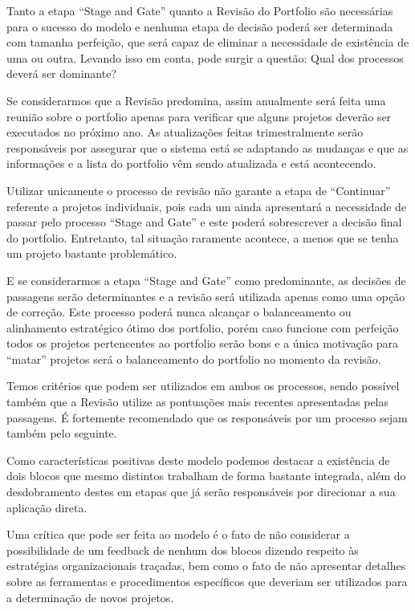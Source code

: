 \documentclass[12pt,a4paper,ruledheader,tocpage=prefix,floatnumber=continuous,pagestart=folhaderosto,font=times]{abnt}
\begin{document}
Tanto a etapa ``Stage and Gate'' quanto a Revisão do Portfolio são necessárias para o sucesso do modelo e nenhuma etapa de decisão poderá ser determinada
com tamanha perfeição, que será capaz de eliminar a necessidade de existência de uma ou outra. Levando isso em conta, pode surgir a questão: Qual dos 
processos deverá ser dominante?

Se considerarmos que a Revisão predomina, assim anualmente será feita uma reunião sobre o portfolio apenas para verificar que alguns projetos deverão
ser executados no próximo ano. As atualizações feitas trimestralmente serão responsáveis por assegurar que o sistema está se adaptando as mudanças
e que as informações e a lista do portfolio vêm sendo atualizada e está acontecendo. 

Utilizar unicamente o processo de revisão não garante a etapa de ``Continuar'' referente a projetos individuais, pois cada um ainda apresentará a 
necessidade de passar pelo processo ``Stage and Gate'' e este poderá sobrescrever a decisão final do portfolio. Entretanto, tal situação raramente 
acontece, a menos que se tenha um projeto bastante problemático.

E se considerarmos a etapa ``Stage and Gate'' como predominante, as decisões de passagens serão determinantes e a revisão será utilizada apenas como
uma opção de correção. Este processo poderá nunca alcançar o balanceamento ou alinhamento estratégico ótimo dos portfolio, porém caso funcione com perfeição
todos os projetos pertencentes ao portfolio serão bons e a única motivação para ``matar'' projetos será o balanceamento do portfolio no momento da 
revisão.

Temos critérios que podem ser utilizados em ambos os processos, sendo possível também que a Revisão utilize as pontuações mais recentes apresentadas pelas 
passagens. É fortemente recomendado que os responsáveis por um processo sejam também pelo seguinte.

Como características positivas deste modelo podemos destacar a existência de dois blocos que mesmo distintos trabalham de forma bastante integrada, 
além do desdobramento destes em etapas que já serão responsáveis por direcionar a sua aplicação direta.

Uma crítica que pode ser feita ao modelo é o fato de não considerar a possibilidade de um feedback de nenhum dos blocos dizendo respeito às estratégias
organizacionais traçadas, bem como o fato de não apresentar detalhes sobre as ferramentas e procedimentos específicos que deveriam ser utilizados
para a determinação de novos projetos.
\end{document}
